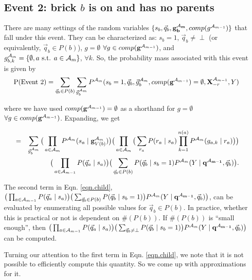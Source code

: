 \documentclass[11pt]{article}
\newcommand{\A}{{\cal A}}
\newcommand{\X}{\mathbf{X}}
\newcommand{\XrmPrev}{\X^{\A_{m-1}}_{-r}}
\newcommand{\Am}{\A_{m}}
\newcommand{\gcompPrev}{comp(\mathbf{g}^{\A_{m-1}})}
\newcommand{\qb}{\vec{q}_b}
\newcommand{\qa}{\vec{q}_a}
\begin{document}
\subsection*{Event 2: brick $b$ is on and has no parents}

There are many settings of the random variables $\{s_b, \qb, \mathbf{g^{\Am}_b}, comp(g^{\A_{m-1}})\}$ that fall under this event. They can be characterized as: $s_b=1$, $\qb \neq \perp$ (or equivalently, $\qb \in P(b)$), $g = \emptyset$ $\forall g \in \gcompPrev$, and $g^{\Am}_{b,k} = \{\emptyset, a \text{ s.t. } a \in {\Am}\}$, $\forall k$. So, the probability mass associated with this event is given by
\begin{eqnarray}
\text{P(Event 2)} = \sum_{\vec{q}_b \in P(b)} \sum_{\vec{g}^{\Am}_{b}} P^{\Am}(s_b=1, \vec{q}_b, \vec{g}^{\Am}_{b}, \gcompPrev = \emptyset, \XrmPrev, Y) \label{eqn.event2}
\end{eqnarray}

where we have used $\gcompPrev = \emptyset$ as a shorthand for $g = \emptyset$ $\forall g \in \gcompPrev$. Expanding, we get

\begin{eqnarray}
&=& \sum_{\vec{g}^{\Am}_{b}} \big( \prod_{a \in {\Am}} P^{\Am}(s_a \mid \mathbf{g}^{\Am}_{V({b})}) \big ) \big( \prod_{a \in {\A_{m}}} \big( \sum_{r_a} P(r_a \mid s_a) \prod_{k=1}^{n(a)} P^{\Am}(g_{a,k} \mid r_a) \big) \big) \label{eqn.child} \\
%
& & \big( \prod_{a \in {\A_{m-1}}} P(\qa \mid s_a)\big) \big( \sum_{\vec{q}_b \in P(b)} P(\qb \mid s_b = 1) P^{\Am}(Y \mid \mathbf{q^{\A_{m-1}}}, \vec{q}_b) \big). \nonumber
\end{eqnarray}

The second term in Eqn. \ref{eqn.child}, $\big( \prod_{a \in {\A_{m-1}}} P(\qa \mid s_a)\big) \big( \sum_{\vec{q}_b \in P(b)} P(\qb \mid s_b = 1)\big) P^{\Am}(Y \mid \mathbf{q^{\A_{m-1}}}, \vec{q}_b) \big)$, can be evaluated by enumerating all possible values for $\vec{q}_b \in P(b)$. In practice, whether this is practical or not is dependent on $\#(P(b))$. If $\#(P(b))$ is ``small enough'', then $\big( \prod_{a \in {\A_{m-1}}} P(\qa \mid s_a)\big) \big( \sum_{\vec{q}_b \neq \perp} P(\qb \mid s_b = 1)\big) P^{\Am}(Y \mid \mathbf{q^{\A_{m-1}}}, \vec{q}_b) \big)$ can be computed. 

Turning our attention to the first term in Eqn. \ref{eqn.child}, we note that it is not possible to efficiently compute this quantity. So we come up with approximations for it.
\end{document}
